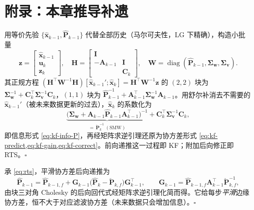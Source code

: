 \section*{附录：本章推导补遗}
\label{sec:eskf-appendix}

\begin{derivation}
用等价先验 $\{\hat{\mathbf{x}}_{k-1},\hat{\mathbf{P}}_{k-1}\}$ 代替全部历史（马尔可夫性，LG 下精确），构造小批量
\[
  \mathbf{z}=\begin{bmatrix}\hat{\mathbf{x}}_{k-1}\\\mathbf{u}_k\\\mathbf{z}_k\end{bmatrix},\quad
  \mathbf{H}=\begin{bmatrix}\mathbf{I}&\\-\mathbf{A}_{k-1}&\mathbf{I}\\&\mathbf{C}_k\end{bmatrix},\quad
  \mathbf{W}=\operatorname{diag}(\hat{\mathbf{P}}_{k-1},\boldsymbol{\Sigma}_{\mathbf{w}},\boldsymbol{\Sigma}_{\mathbf{v}}).
\]
其正规方程 $(\mathbf{H}^\top\mathbf{W}^{-1}\mathbf{H})[\hat{\mathbf{x}}_{k-1}';\hat{\mathbf{x}}_k]=\mathbf{H}^\top\mathbf{W}^{-1}\mathbf{z}$ 的 $(2,2)$ 块为 $\boldsymbol{\Sigma}_{\mathbf{w}}^{-1}+\mathbf{C}_k^\top\boldsymbol{\Sigma}_{\mathbf{v}}^{-1}\mathbf{C}_k$，$(1,1)$ 块为 $\hat{\mathbf{P}}_{k-1}^{-1}+\mathbf{A}_{k-1}^\top\boldsymbol{\Sigma}_{\mathbf{w}}^{-1}\mathbf{A}_{k-1}$。用舒尔补消去不需要的 $\hat{\mathbf{x}}_{k-1}'$（被未来数据更新的过去），$\hat{\mathbf{x}}_k$ 的系数化为
\[
  \underbrace{\big(\boldsymbol{\Sigma}_{\mathbf{w}}+\mathbf{A}_{k-1}\hat{\mathbf{P}}_{k-1}\mathbf{A}_{k-1}^\top\big)^{-1}}_{=\,\check{\mathbf{P}}_k^{-1}\ (\text{SMW})}+\mathbf{C}_k^\top\boldsymbol{\Sigma}_{\mathbf{v}}^{-1}\mathbf{C}_k,
\]
即信息形式 \cref{eq:kf-info-P}，再经矩阵求逆引理还原为协方差形式 \cref{eq:kf-predict,eq:kf-gain,eq:kf-correct}。前向递推这一过程即 KF；附加后向修正即 RTS。\hfill$\square$
\end{derivation}

\begin{derivation}
承 \cref{eq:rts}，平滑协方差后向递推为
\[
  \hat{\mathbf{P}}_{k-1}=\hat{\mathbf{P}}_{k-1,f}+\mathbf{G}_{k-1}\big(\hat{\mathbf{P}}_k-\check{\mathbf{P}}_{k,f}\big)\mathbf{G}_{k-1}^\top,\qquad
  \mathbf{G}_{k-1}=\hat{\mathbf{P}}_{k-1,f}\mathbf{A}_{k-1}^\top\check{\mathbf{P}}_{k,f}^{-1},
\]
由块三对角 Cholesky 的后向回代式经矩阵求逆引理化简而得\cite{barfoot2024state}。它给每步\emph{平滑}边缘协方差，恒不大于对应滤波协方差（未来数据只会增加信息）。\hfill$\square$
\end{derivation}

